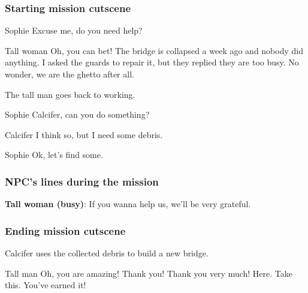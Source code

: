 \subsubsection*{Starting mission cutscene}
\begin{screenplay}

\begin{dialogue}{Sophie}
Excuse me, do you need help?
\end{dialogue}

\begin{dialogue}{Tall woman}
Oh, you can bet! The bridge is collapsed a week ago and nobody did anything. I asked the guards to repair it, but they replied they are too busy. No wonder, we are the ghetto after all.
\end{dialogue}

The tall man goes back to working.

\begin{dialogue}{Sophie}
Calcifer, can you do something?
\end{dialogue}

\begin{dialogue}{Calcifer}
I think so, but I need some debris.
\end{dialogue}

\begin{dialogue}{Sophie}
Ok, let's find some.
\end{dialogue}

\end{screenplay}

\subsubsection*{NPC's lines during the mission}
\textbf{Tall woman (busy)}: If you wanna help us, we'll be very grateful.

\subsubsection*{Ending mission cutscene}
\begin{screenplay}

Calcifer uses the collected debris to build a new bridge.

\begin{dialogue}[excited]{Tall man}
Oh, you are amazing! Thank you! Thank you very much! Here. Take this. You've earned it!
\end{dialogue}


\end{screenplay}


